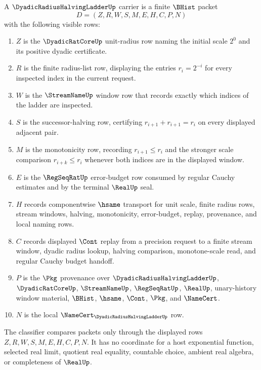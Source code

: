 \begin{definition}
\label{def:dyadic-radius-halving-ladder-carrier}
A $\DyadicRadiusHalvingLadderUp$ carrier is a finite $\BHist$ packet
$$
D=(Z,R,W,S,M,E,H,C,P,N)
$$
with the following visible rows:
\begin{enumerate}
\item $Z$ is the $\DyadicRatCoreUp$ unit-radius row naming the initial scale $2^{0}$ and its positive dyadic certificate.
\item $R$ is the finite radius-list row, displaying the entries $r_i=2^{-i}$ for every inspected index in the current request.
\item $W$ is the $\StreamNameUp$ window row that records exactly which indices of the ladder are inspected.
\item $S$ is the successor-halving row, certifying $r_{i+1}+r_{i+1}=r_i$ on every displayed adjacent pair.
\item $M$ is the monotonicity row, recording $r_{i+1}\le r_i$ and the stronger scale comparison $r_{i+k}\le r_i$ whenever both indices are in the displayed window.
\item $E$ is the $\RegSeqRatUp$ error-budget row consumed by regular Cauchy estimates and by the terminal $\RealUp$ seal.
\item $H$ records componentwise $\hsame$ transport for unit scale, finite radius rows, stream windows, halving, monotonicity, error-budget, replay, provenance, and local naming rows.
\item $C$ records displayed $\Cont$ replay from a precision request to a finite stream window, dyadic radius lookup, halving comparison, monotone-scale read, and regular Cauchy budget handoff.
\item $P$ is the $\Pkg$ provenance over $\DyadicRadiusHalvingLadderUp$, $\DyadicRatCoreUp$, $\StreamNameUp$, $\RegSeqRatUp$, $\RealUp$, unary-history window material, $\BHist$, $\hsame$, $\Cont$, $\Pkg$, and $\NameCert$.
\item $N$ is the local $\NameCert_{\DyadicRadiusHalvingLadderUp}$ row.
\end{enumerate}
The classifier compares packets only through the displayed rows $Z,R,W,S,M,E,H,C,P,N$. It has no coordinate for a host exponential function, selected real limit, quotient real equality, countable choice, ambient real algebra, or completeness of $\RealUp$.
\end{definition}

